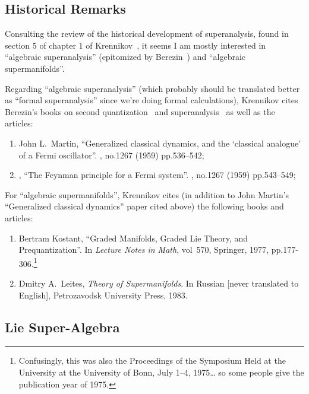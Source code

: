 \subsection{Historical Remarks}
Consulting the review of the historical development of superanalysis,
found in section 5 of chapter 1 of Krennikov~\cite{Khrennikov:1999bd},
it seems I am mostly interested in ``algebraic superanalysis''
(epitomized by Berezin~\cite{Berezin:1987wh}) and ``algebraic
supermanifolds''.

Regarding ``algebraic superanalysis'' (which probably should be
translated better as ``formal superanalysis'' since we're doing formal
calculations), Krennikov cites Berezin's books on second
quantization~\cite{Berezin:1966nc} and
superanalysis~\cite{Berezin:1987wh} as well as the articles:
\begin{enumerate}[resume*]
\item John L.~Martin, %
``Generalized classical dynamics, and the ‘classical analogue’ of a
  Fermi oscillator''.  , no.1267
  (1959) pp.536--542;\newline
  {\tt{}}
\item \bysame, %
  ``The Feynman principle for a Fermi system''.
   , no.1267
  (1959) pp.543--549;\newline
  {\tt{}}
\end{enumerate}
For ``algebraic supermanifolds'', Krennikov cites (in addition to John
Martin's ``Generalized classical dynamics'' paper cited above) the following
books and articles:
\begin{enumerate}[resume*]
\item Bertram Kostant, ``Graded Manifolds, Graded Lie Theory, and
  Prequantization''. In \textit{Lecture Notes in Math}, vol~570,
  Springer, 1977, pp.177-306.\footnote{Confusingly, this was also the Proceedings of the Symposium Held at the University at the University of Bonn, July 1--4, 1975\dots%
 so some people give the publication year of 1975.}\newline
  {\tt{}}
\item Dmitry A.~Leites,
  \textit{Theory of Supermanifolds}.
  In Russian [never translated to English], Petrozavodsk University
  Press, 1983.
\end{enumerate}

\subsection{Lie Super-Algebra}

